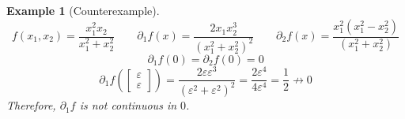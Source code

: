 \documentclass{article}
\newtheorem{example}{Example}  \numberwithin{example}{section}
\begin{document}
\begin{example}[Counterexample]
  \[
    f(x_1, x_2) = \frac{x_1^2 x_2}{x_1^2 + x_2^2}
    \qquad \partial_1 f(x) = \frac{2x_1 x_2^3}{(x_1^2 + x_2^2)^2}
    \qquad \partial_2 f(x) = \frac{x_1^2 (x_1^2 - x_2^2)}{(x_1^2 + x_2^2)}
  \] \[
    \partial_1 f(0) = \partial_2 f(0) = 0
  \] \[
    \partial_1f(\begin{bmatrix} \varepsilon \\ \varepsilon \end{bmatrix}) = \frac{2 \varepsilon \varepsilon^3}{(\varepsilon^2 + \varepsilon^2)^2} = \frac{2\varepsilon^4}{4 \varepsilon^4} = \frac12 \not\to 0
  \]
  Therefore, $\partial_1 f$ is not continuous in $0$.
\end{example}

\printindex
\end{document}
